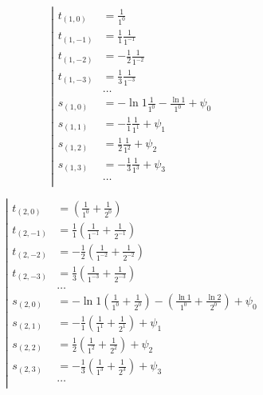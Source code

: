 \begin{equation*} \left| \begin{aligned}
t_{(1,0)} &=
  \frac{1}{1^0} \\
%
t_{(1,-1)} &=
  \frac{1}{1} \frac{1}{1^{-1}} \\
%
t_{(1,-2)} &=
  - \frac{1}{2} \frac{1}{1^{-2}} \\
%
t_{(1,-3)} &=
  \frac{1}{3} \frac{1}{1^{-3}} \\
%
&\ldots \\
%
s_{(1,0)} &=
- \ln{1} \frac{1}{1^0}
- \frac{\ln{1}}{1^0}
+ \psi_0 \\
%
s_{(1,1)} &=
- \frac{1}{1} \frac{1}{1^1}
+ \psi_1 \\
%
s_{(1,2)} &=
  \frac{1}{2} \frac{1}{1^2}
+ \psi_2 \\
%
s_{(1,3)} &=
- \frac{1}{3} \frac{1}{1^3}
+ \psi_3 \\
%
&\ldots \\
\end{aligned} \right. \end{equation*}

\begin{equation*} \left| \begin{aligned}
t_{(2,0)} &=
  \left(
  \frac{1}{1^0}
+ \frac{1}{2^0} \right) \\
%
t_{(2,-1)} &=
  \frac{1}{1} \left(
  \frac{1}{1^{-1}}
+ \frac{1}{2^{-1}} \right) \\
%
t_{(2,-2)} &=
- \frac{1}{2} \left(
  \frac{1}{1^{-2}}
+ \frac{1}{2^{-2}} \right) \\
%
t_{(2,-3)} &=
  \frac{1}{3} \left(
  \frac{1}{1^{-3}}
+ \frac{1}{2^{-3}} \right) \\
%
&\ldots \\
%
s_{(2,0)} &=
- \ln{1} \left(
  \frac{1}{1^0}
+ \frac{1}{2^0} \right)
- \left(
  \frac{\ln{1}}{1^0}
+ \frac{\ln{2}}{2^0} \right)
+ \psi_0 \\
%
s_{(2,1)} &=
- \frac{1}{1} \left(
  \frac{1}{1^1}
+ \frac{1}{2^1} \right)
+ \psi_1 \\
%
s_{(2,2)} &=
  \frac{1}{2} \left(
  \frac{1}{1^2}
+ \frac{1}{2^2} \right)
+ \psi_2 \\
%
s_{(2,3)} &=
- \frac{1}{3} \left(
  \frac{1}{1^3}
+ \frac{1}{2^3} \right)
+ \psi_3 \\
%
&\ldots \\
\end{aligned} \right. \end{equation*}

